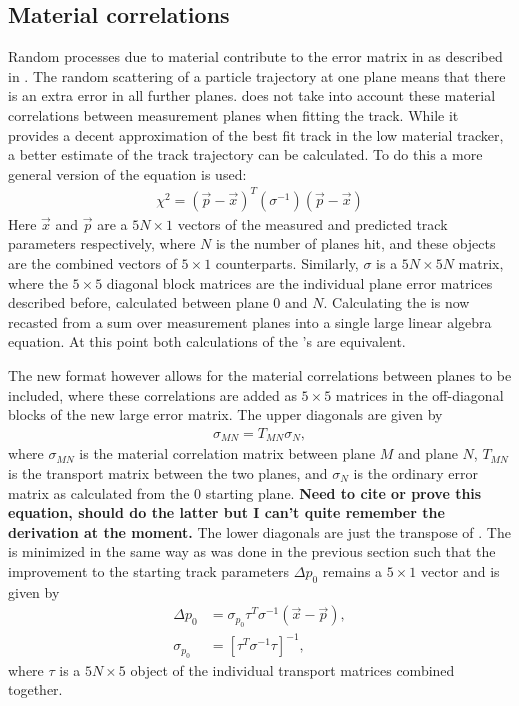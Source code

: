

\subsection{Material correlations}


Random processes due to material contribute to the error matrix in  as described in . The random scattering of a particle trajectory at one plane means that there is an extra error in all further planes.  does not take into account these material correlations between measurement planes when fitting the track. While it provides a decent approximation of the best fit track in the low material tracker, a better estimate of the track trajectory can be calculated. To do this a more general version of the \chisq equation is used:
        \begin{align} \label{eq:chi2full}
            \chi^2 = (\vec{p}-\vec{x})^{T} (\sigma^{-1}) (\vec{p}-\vec{x})
        \end{align}
Here $\vec{x}$ and $\vec{p}$ are a $5N \times 1$ vectors of the measured and predicted track parameters respectively, where $N$ is the number of planes hit, and these objects are the combined vectors of $5 \times 1$ counterparts. Similarly, $\sigma$ is a $5N \times 5N$ matrix, where the $5 \times 5$ diagonal block matrices are the individual plane error matrices described before, calculated between plane 0 and $N$. Calculating the \chisq is now recasted from a sum over measurement planes into a single large linear algebra equation. At this point both calculations of the \chisq's are equivalent.


The new format however allows for the material correlations between planes to be included, where these correlations are added as $5 \times 5$ matrices in the off-diagonal blocks of the new large error matrix. The upper diagonals are given by 
    \begin{align} \label{eq:corr}
        \sigma_{MN} = T_{MN} \sigma_{N}, 
    \end{align}
where $\sigma_{MN}$ is the material correlation matrix between plane $M$ and plane $N$, $T_{MN}$ is the transport matrix between the two planes, and $\sigma_{N}$ is the ordinary error matrix as calculated from the 0 starting plane. \textbf{Need to cite or prove this equation, should do the latter but I can't quite remember the derivation at the moment.} The lower diagonals are just the transpose of . The \chisq is minimized in the same way as was done in the previous section such that the improvement to the starting track parameters $\Delta p_{0}$ remains a $5 \times 1$ vector and is given by
    \begin{align} \label{eq:deltafull}
        \Delta p_{0} &= \sigma_{p_{0}} \tau^{T}\sigma^{-1}(\vec{x}-\vec{p}), \\
        \sigma_{p_{0}} &= [\tau^{T} \sigma^{-1} \tau ]^{-1},
    \end{align}
where $\tau$ is a $5N \times 5$ object of the individual transport matrices combined together.


